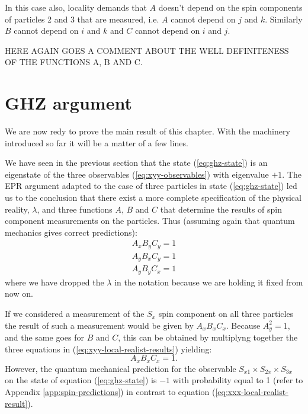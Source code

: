 In this case also, locality demands that $A$ doesn't depend on the spin components of particles 2 and 3 that are measured, i.e. $A$ cannot depend on $j$ and $k$. Similarly $B$ cannot depend on $i$ and $k$ and $C$ cannot depend on $i$ and $j$.

\begin{observation}
  HERE AGAIN GOES A COMMENT ABOUT THE WELL DEFINITENESS OF THE FUNCTIONS A, B AND C.
\end{observation}


\section{GHZ argument}
We are now redy to prove the main result of this chapter. With the machinery introduced so far it will be a matter of a few lines.

We have seen in the previous section that the state (\ref{eq:ghz-state}) is an eigenstate of the three observables (\ref{eq:xyy-observables}) with eigenvalue $+ 1$. The EPR argument adapted to the case of three particles in state (\ref{eq:ghz-state}) led us to the conclusion that there exist a more complete specification of the physical reality, $\lambda$, and three functions $A$, $B$ and $C$ that determine the results of spin component measurements on the particles. Thus (assuming again that quantum mechanics gives correct predictions):%
\begin{equation}
  \begin{split}
    A_x B_y C_y = 1\\
    A_y B_x C_y = 1\\
    A_y B_y C_x = 1
  \end{split}
  \label{eq:xyy-local-realist-results}
\end{equation}
where we have dropped the $\lambda$ in the notation because we are holding it fixed from now on.

If we considered a measurement of the $S_x$ spin component on all three particles the result of such a measurement would be given by $A_x B_x C_x$. Because $A_y^2 = 1$, and the same goes for $B$ and $C$, this can be obtained by multiplyng together the three equations in (\ref{eq:xyy-local-realist-results}) yielding:
\begin{equation}
  A_x B_x C_x = 1.
  \label{eq:xxx-local-realist-result}
\end{equation}
However, the quantum mechanical prediction for the observable $S_{x1} \times S_{2x} \times S_{3x}$ on the state of equation (\ref{eq:ghz-state}) is $- 1$ with probability equal to 1 (refer to Appendix \ref{app:spin-predictions}) in contrast to equation (\ref{eq:xxx-local-realist-result}).

